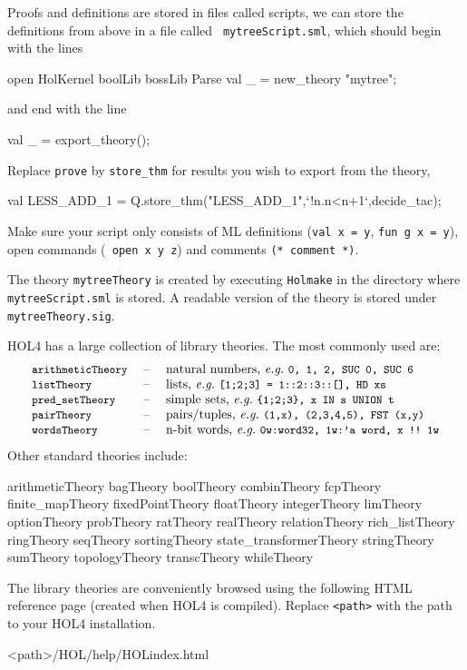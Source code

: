 \documentclass[a4paper,10pt]{article}
\begin{document}

Proofs and definitions are stored in files called scripts, \eg{} we
can store the definitions from above in a file called {\tt
  mytreeScript.sml}, which should begin with the lines
\begin{code}
open HolKernel boolLib bossLib Parse
val _ = new_theory "mytree";
\end{code}
and end with the line
\begin{code}
val _ = export_theory();
\end{code}
Replace {\tt prove} by {\tt store\_thm} for results you
wish to export from the theory, \eg{}
\begin{code}
val LESS_ADD_1 = Q.store_thm("LESS_ADD_1",{`}!n.n<n+1{`},decide_tac);
\end{code}
Make sure your script only consists of ML definitions ({\tt \small val
  x = y}, {\tt \small fun g x = y}), open commands ({\tt \small
  open x y z}) and comments {\tt \small (* comment *)}.

The theory {\tt mytreeTheory} is created by executing {\tt Holmake} in
the directory where {\tt mytreeScript.sml} is stored. A
readable version of the theory is stored under {\tt mytreeTheory.sig}.


\newcommand{\itemx}[2]{\texttt{\small #1} &\;\textrm{--}\;& \textrm{#2} \\}

HOL4 has a large collection of library theories. The most commonly used are:
\begin{displaymath}
\begin{array}{lcl}
\itemx{arithmeticTheory}{natural numbers, \eg{} {\tt\small 0, 1, 2, SUC 0, SUC 6}}
\itemx{listTheory}{lists, \eg{} {\tt\small [1;2;3] = 1::2::3::[], HD xs}}
\itemx{pred\_setTheory}{simple sets,\ \eg{} {\tt\small \{1;2;3\}, x IN s UNION t}}
\itemx{pairTheory}{pairs/tuples,\ \eg{} {\tt\small (1,x), (2,3,4,5), FST (x,y)}}
\itemx{wordsTheory}{n-bit words,\ \eg{} {\tt\small 0w:word32, 1w:'a word, x {!!}~1w}}
\end{array}
\end{displaymath}
Other standard theories include:
\begin{code}
arithmeticTheory  bagTheory  boolTheory  combinTheory  fcpTheory
finite_mapTheory  fixedPointTheory  floatTheory  integerTheory
limTheory  optionTheory  probTheory  ratTheory  realTheory
relationTheory  rich_listTheory  ringTheory  seqTheory
sortingTheory  state_transformerTheory  stringTheory  sumTheory
topologyTheory  transcTheory  whileTheory
\end{code}
The library theories are conveniently browsed using the following HTML reference page (created when HOL4 is compiled).
Replace {\tt <path>} with the path to your HOL4 installation.
\begin{code}
<path>/HOL/help/HOLindex.html
\end{code}
\end{document}
